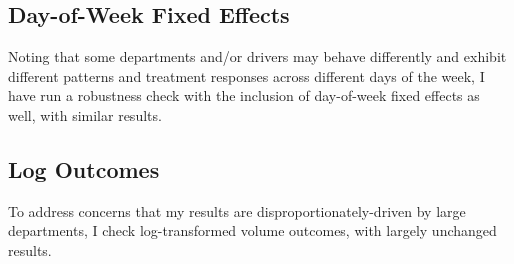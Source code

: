 \documentclass[12pt,a4paper]{article}
\begin{document}
\clearpage
\subsection{Day-of-Week Fixed Effects}
Noting that some departments and/or drivers may behave differently and exhibit different patterns and treatment responses across different days of the week, I have run a robustness check with the inclusion of day-of-week fixed effects as well, with similar results. \\

\begin{table}
	\begin{center}
		
		\caption[Volume Outcome Estiamtes, DOW FEs]{This table gives volume outcome coefficient estimates for the treatment effect following a shooting event both overall using equation \ref{eq1_DiD} in Panel A and by scrutiny level using equation \ref{eq3_DiDiD} in Panel B.}
		\label{full_DiD_volumes_A02}
	\end{center}
\end{table}

\begin{table}
	\begin{center}
		
		\caption[Rate Outcome Estimates, DOW FEs]{This table gives rate outcome coefficient estimates for the treatment effect following a shooting event both overall using equation \ref{eq1_DiD} in Panel A and by scrutiny level using equation \ref{eq3_DiDiD} in Panel B.}
		\label{full_DiD_rates_A02}
	\end{center}
\end{table}

\clearpage
\subsection{Log Outcomes}
To address concerns that my results are disproportionately-driven by large departments, I check log-transformed volume outcomes, with largely unchanged results. \\

\begin{table}
	\begin{center}
		
		\caption[Volume Outcome Estimates, Log Transformation]{This table gives volume outcome coefficient estimates for the treatment effect following a shooting event both overall using equation \ref{eq1_DiD} in Panel A and by scrutiny level using equation \ref{eq3_DiDiD} in Panel B.}
		\label{full_DiD_volumes_A03}
	\end{center}
\end{table}
\end{document}
